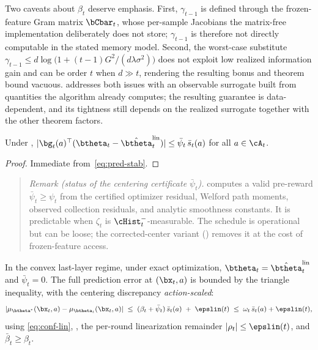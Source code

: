 \begin{remark}
Two caveats about $\beta_t$ deserve emphasis.
First, $\gamma_{t-1}$ is defined through the frozen-feature Gram
matrix $\bCbar_t$, whose per-sample Jacobians the matrix-free
implementation deliberately does not store; $\gamma_{t-1}$ is
therefore not directly computable in the stated memory model.
Second, the worst-case substitute
$\gamma_{t-1}\le d\log\bigl(1+(t-1)G^2/(d\lambda\sigma^2)\bigr)$
does not exploit low realized information gain and can be order $t$ when
$d\gg t$, rendering the resulting bonus and theorem bound vacuous.
 addresses both issues with an observable surrogate
built from quantities the algorithm already computes; the resulting
guarantee is data-dependent, and its tightness still depends on the realized
surrogate together with the other theorem factors.
\end{remark}

\begin{lemma}\label{lem:discrepancy}
Under ,
$|\bg_t(a)^\top(\btheta_t - \hat\btheta_t^{\mathrm{lin}})|\le
\bar\psi_t\,\bar s_t(a)$
for all $a\in\cA_t$.
\end{lemma}
\begin{proof}
Immediate from~\eqref{eq:pred-stab}.
\end{proof}

\begin{quote}
\emph{Remark (status of the centering certificate $\bar\psi_t$).}
 computes a valid pre-reward
$\bar\psi_t\ge\psi_t$ from the certified optimizer residual, Welford path
moments, observed collection residuals, and analytic smoothness constants.
It is predictable when $\zeta_t$ is $\cHist_t^-$-measurable.
The schedule is operational but can be loose; the corrected-center variant
() removes it at the cost of frozen-feature access.
\end{quote}
In the convex last-layer regime, under exact optimization,
$\btheta_t = \hat\btheta_t^{\mathrm{lin}}$ and $\bar\psi_t=0$.
The full prediction error at $(\bx_t,a)$ is bounded by the triangle
inequality, with the centering discrepancy \emph{action-scaled}:
\begin{equation}\label{eq:pred-error}
  |\mu_{\btheta^*}(\bx_t,a) - \mu_{\btheta_t}(\bx_t,a)|
  \;\le\;
  (\beta_t+\bar\psi_t)\,\bar s_t(a)
  \;+\;
  \epslin(t)
  \;\le\;
  \omega_t\,\bar s_t(a)+\epslin(t),
\end{equation}
using \eqref{eq:conf-lin}, , the per-round
linearization remainder $|\rho_t|\le\epslin(t)$, and $\bar\beta_t\ge\beta_t$.



